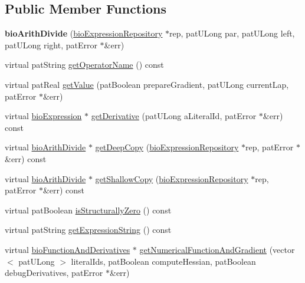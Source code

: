\subsection*{Public Member Functions}
\begin{DoxyCompactItemize}
\item 
\mbox{\label{classbio_arith_divide_a5aeb2aa48813d8c1a47d27dc02f4bf34}} 
{\bfseries bio\+Arith\+Divide} (\hyperlink{classbio_expression_repository}{bio\+Expression\+Repository} $\ast$rep, pat\+U\+Long par, pat\+U\+Long left, pat\+U\+Long right, pat\+Error $\ast$\&err)
\item 
virtual pat\+String \hyperlink{classbio_arith_divide_a544e0dc66cfb2be23226a968b5d7c5cb}{get\+Operator\+Name} () const
\item 
virtual pat\+Real \hyperlink{classbio_arith_divide_a8c979df7aee15572084ac982d1bd0740}{get\+Value} (pat\+Boolean prepare\+Gradient, pat\+U\+Long current\+Lap, pat\+Error $\ast$\&err)
\item 
virtual \hyperlink{classbio_expression}{bio\+Expression} $\ast$ \hyperlink{classbio_arith_divide_a9a30c3d5586f0bce3b09cc2c932e5f67}{get\+Derivative} (pat\+U\+Long a\+Literal\+Id, pat\+Error $\ast$\&err) const
\item 
virtual \hyperlink{classbio_arith_divide}{bio\+Arith\+Divide} $\ast$ \hyperlink{classbio_arith_divide_aa867fd8e74e654f419eee829a08e816c}{get\+Deep\+Copy} (\hyperlink{classbio_expression_repository}{bio\+Expression\+Repository} $\ast$rep, pat\+Error $\ast$\&err) const
\item 
virtual \hyperlink{classbio_arith_divide}{bio\+Arith\+Divide} $\ast$ \hyperlink{classbio_arith_divide_a381a838c2c02b9f1cf9c7a4b6586dbca}{get\+Shallow\+Copy} (\hyperlink{classbio_expression_repository}{bio\+Expression\+Repository} $\ast$rep, pat\+Error $\ast$\&err) const
\item 
virtual pat\+Boolean \hyperlink{classbio_arith_divide_a0363fd1159b9167508dcf989844eebb7}{is\+Structurally\+Zero} () const
\item 
virtual pat\+String \hyperlink{classbio_arith_divide_a11ecaa69e3d86cb8598770f40ec03753}{get\+Expression\+String} () const
\item 
virtual \hyperlink{classbio_function_and_derivatives}{bio\+Function\+And\+Derivatives} $\ast$ \hyperlink{classbio_arith_divide_a29465844ff4722a8d542c8a6935c2686}{get\+Numerical\+Function\+And\+Gradient} (vector$<$ pat\+U\+Long $>$ literal\+Ids, pat\+Boolean compute\+Hessian, pat\+Boolean debug\+Derivatives, pat\+Error $\ast$\&err)
\end{DoxyCompactItemize}
